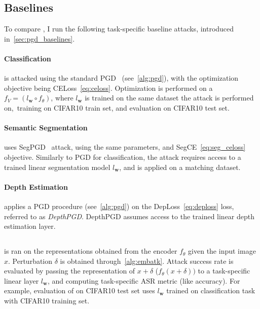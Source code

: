\subsection{Baselines}

To compare \EmbedAttack, I run the following task-specific baseline attacks, introduced in~\cref{sec:pgd_baselines}. 

\paragraph{Classification} is attacked using the standard PGD~\cite{pgd} (see~\cref{alg:pgd}), with the optimization objective being CELoss~\cref{eq:celoss}. Optimization is performed on a $f_V=(l_\mathbf{w}\circ f_\theta)$, where $l_\mathbf{w}$ is trained on the same dataset the attack is performed on,~\eg training on CIFAR10 train set, and evaluation on CIFAR10 test set.

\paragraph{Semantic Segmentation} uses SegPGD~\cite{segpgd} attack, using the same parameters, and SegCE~\cref{eq:seg_celoss} objective. Similarly to PGD for classification, the attack requires access to a trained linear segmentation model $l_\mathbf{w}$, and is applied on a matching dataset.

\paragraph{Depth Estimation} applies a PGD procedure (see~\cref{alg:pgd}) on the DepLoss~\cref{eq:deploss} loss, referred to as \textit{DepthPGD}. DepthPGD assumes access to the trained linear depth estimation layer.

\subsection{\EmbedAttack}

\EmbedAttack is ran on the representations obtained from the encoder $f_\theta$ given the input image $x$. Perturbation $\delta$ is obtained through~\cref{alg:embatk}. Attack success rate is evaluated by passing the representation of $x+\delta$ ($f_\theta(x+\delta))$ to a task-specific linear layer $l_\mathbf{w}$, and computing task-specific ASR metric (like accuracy). For example, evaluation of \EmbedAttack on CIFAR10 test set uses $l_\mathbf{w}$ trained on classification task with CIFAR10 training set.